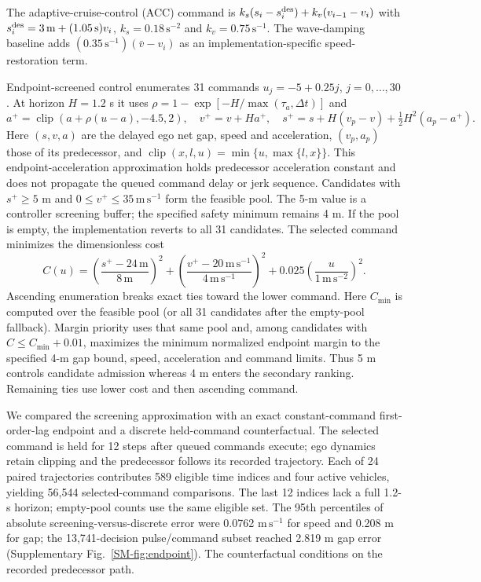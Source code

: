 \documentclass[12pt]{article}
\begin{document}
The adaptive-cruise-control (ACC) command is $k_s(s_i-s_i^{\rm des})+k_v(v_{i-1}-v_i)$ with $s_i^{\rm des}=3\,\mathrm m+(1.05\,\mathrm s)v_i$, $k_s=0.18\,\mathrm{s^{-2}}$ and $k_v=0.75\,\mathrm{s^{-1}}$. The wave-damping baseline adds $(0.35\,\mathrm{s^{-1}})(\bar v-v_i)$ as an implementation-specific speed-restoration term.

Endpoint-screened control enumerates 31 commands $u_j=-5+0.25j$, $j=0,\ldots,30$. At horizon $H=1.2$ s it uses $\rho=1-\exp[-H/\max(\tau_a,\Delta t)]$ and
\begin{equation}
a^+=\operatorname{clip}(a+\rho(u-a),-4.5,2),\quad v^+=v+Ha^+,
\quad s^+=s+H(v_p-v)+\tfrac12H^2(a_p-a^+).
\end{equation}
Here $(s,v,a)$ are the delayed ego net gap, speed and acceleration, $(v_p,a_p)$ those of its predecessor, and $\operatorname{clip}(x,l,u)=\min\{u,\max\{l,x\}\}$. This endpoint-acceleration approximation holds predecessor acceleration constant and does not propagate the queued command delay or jerk sequence. Candidates with $s^+\ge5$ m and $0\le v^+\le35\,\mathrm{m\,s^{-1}}$ form the feasible pool. The 5-m value is a controller screening buffer; the specified safety minimum remains 4 m. If the pool is empty, the implementation reverts to all 31 candidates. The selected command minimizes the dimensionless cost
\begin{equation}
C(u)=\left(\frac{s^+-24\,\mathrm m}{8\,\mathrm m}\right)^2+
\left(\frac{v^+-20\,\mathrm{m\,s^{-1}}}{4\,\mathrm{m\,s^{-1}}}\right)^2+
0.025\left(\frac{u}{1\,\mathrm{m\,s^{-2}}}\right)^2.
\end{equation}
Ascending enumeration breaks exact ties toward the lower command. Here $C_{\min}$ is computed over the feasible pool (or all 31 candidates after the empty-pool fallback). Margin priority uses that same pool and, among candidates with $C\le C_{\min}+0.01$, maximizes the minimum normalized endpoint margin to the specified 4-m gap bound, speed, acceleration and command limits. Thus 5 m controls candidate admission whereas 4 m enters the secondary ranking. Remaining ties use lower cost and then ascending command.

We compared the screening approximation with an exact constant-command first-order-lag endpoint and a discrete held-command counterfactual. The selected command is held for 12 steps after queued commands execute; ego dynamics retain clipping and the predecessor follows its recorded trajectory. Each of 24 paired trajectories contributes 589 eligible time indices and four active vehicles, yielding 56,544 selected-command comparisons. The last 12 indices lack a full 1.2-s horizon; empty-pool counts use the same eligible set. The 95th percentiles of absolute screening-versus-discrete error were 0.0762 $\mathrm{m\,s^{-1}}$ for speed and 0.208 m for gap; the 13,741-decision pulse/command subset reached 2.819 m gap error (Supplementary Fig.~\ref{SM-fig:endpoint}). The counterfactual conditions on the recorded predecessor path.
\end{document}
